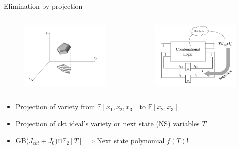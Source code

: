 \documentclass[xcolor=dvipsnames]{beamer}
\newcommand{\bi}{\begin{itemize}}
\newcommand{\ei}{\end{itemize}}
\newcommand{\F}{{\mathbb{F}}}
\begin{document}
\begin{frame}{\large{Elimination by projection}}
\vspace{-0.1in}
\begin{columns}[onlytextwidth]
\begin{column}{0.5\textwidth}
\begin{figure}
\centering
\includegraphics[scale=0.25]{../newfig/projection.pdf}
\end{figure}
\end{column}
\begin{column}{0.5\textwidth}
\begin{figure}
\centering
\includegraphics[scale=0.25]{../newfig/proj_reacha.pdf}
\end{figure}
\end{column}
\end{columns}
\bi
\item Projection of variety from $\F[x_1,x_2,x_3]$ to $\F[x_2,x_3]$
\item Projection of ckt ideal's variety on next state (NS) variables $T$
\pause
\item GB($J_{ckt}+J_0$)$\cap\F_2[T] \implies $Next state polynomial $f(T)$!
\ei
\end{frame}
\end{document}
